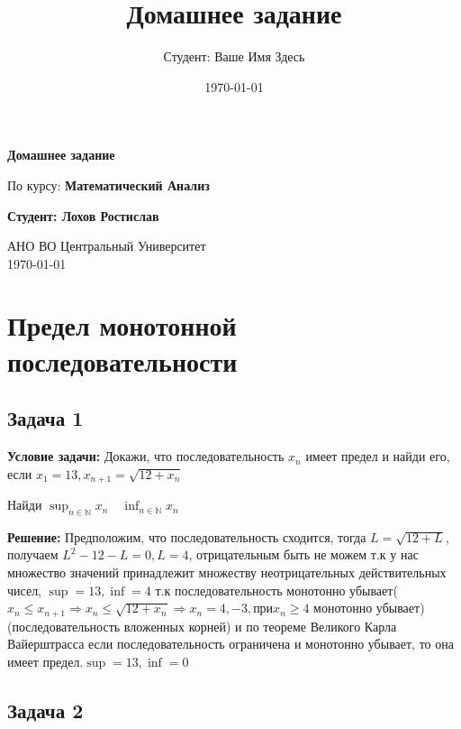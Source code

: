 \documentclass[a4paper,12pt]{article}
\title{Домашнее задание}
\author{Студент: Ваше Имя Здесь}
\date{\today}
\begin{document}
\begin{titlepage}
    \centering
    \vspace*{1cm}

    \Huge
    \textbf{Домашнее задание}

    \vspace{0.5cm}
    \LARGE
    По курсу: \textbf{Математический Анализ}

    \vspace{1.5cm}

    \textbf{Студент: Лохов Ростислав}

    \vfill

    \Large
    АНО ВО Центральный Университет\\
    \vspace{0.3cm}
    \today

\end{titlepage}

\tableofcontents
\newpage


\section{Предел монотонной последовательности}

\subsection{Задача 1}
\textbf{Условие задачи:}
Докажи, что последовательность ${x_n}$ имеет предел и найди его, если $x_1=13, x_{n+1}=\sqrt{12+x_n}$

Найди $\sup_{n \in \mathbb{N}} x_n \quad \inf_{n \in \mathbb{N}} x_n$

\textbf{Решение:}
Предположим, что последовательность сходится, тогда $L=\sqrt{12+L}$, получаем $L^2-12-L=0, L=4$, отрицательным быть не можем т.к у нас множество значений принадлежит множеству неотрицательных действительных чисел, $\sup = 13, \inf = 4$ т.к последовательность монотонно убывает($x_n \le x_{n+1} \Rightarrow x_n \le \sqrt{12+x_n} \Rightarrow x_n= 4, -3, \text{при} x_n \ge 4 \text{ монотонно убывает}$) (последовательность вложенных корней) и по теореме Великого Карла Вайерштрасса если последовательность ограничена и монотонно убывает, то она имеет предел.$\sup = 13, \inf = 0$ 
\vspace{1cm}

\subsection{Задача 2}
\end{document}
